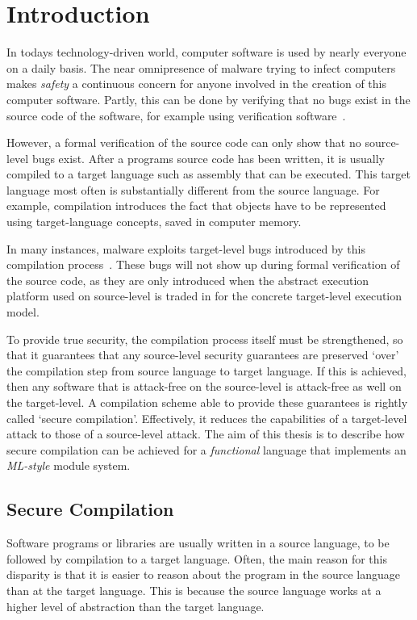 \chapter{Introduction}

In todays technology-driven world, computer software is used by nearly everyone on a daily basis.
The near omnipresence of malware trying to infect computers makes \emph{safety} a continuous concern for anyone involved in the creation of this computer software.
Partly, this can be done by verifying that no bugs exist in the source code of the software, for example using verification software~\cite{Verifast:paper,Verifast:tutorial}.

However, a formal verification of the source code can only show that no source-level bugs exist.
After a programs source code has been written, it is usually compiled to a target language such as assembly that can be executed.
This target language most often is substantially different from the source language.
For example, compilation introduces the fact that objects have to be represented using target-language concepts, saved in computer memory.

In many instances, malware exploits target-level bugs introduced by this compilation process~\cite{OVSPaper,Younan:2012:RCC:2187671.2187679}.
These bugs will not show up during formal verification of the source code, as they are only introduced when the abstract execution platform used on source-level is traded in for the concrete target-level execution model.

To provide true security, the compilation process itself must be strengthened, so that it guarantees that any source-level security guarantees are preserved `over' the compilation step from source language to target language.
If this is achieved, then any software that is attack-free on the source-level is attack-free as well on the target-level.
A compilation scheme able to provide these guarantees is rightly called `secure compilation'.
Effectively, it reduces the capabilities of a target-level attack to those of a source-level attack.
The aim of this thesis is to describe how secure compilation can be achieved for a \emph{functional} language that implements an \emph{ML-style} module system.


\section{Secure Compilation}
\label{sec:SecureCompilation}
Software programs or libraries are usually written in a source language, to be followed by compilation to a target language.
Often, the main reason for this disparity is that it is easier to reason about the program in the source language than at the target language.
This is because the source language works at a higher level of abstraction than the target language.

